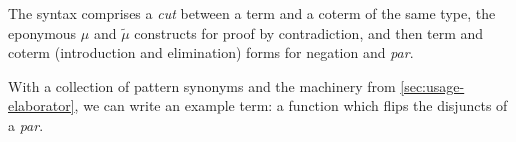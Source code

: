 The syntax comprises a \emph{cut} between a term and a coterm of the same type,
the eponymous $\mu$ and $\tilde\mu$ constructs for proof by contradiction, and
then term and coterm (introduction and elimination) forms for negation and
\emph{par}.


With a collection of pattern synonyms and the machinery from
\cref{sec:usage-elaborator}, we can write an example term: a function which
flips the disjuncts of a \emph{par}.

